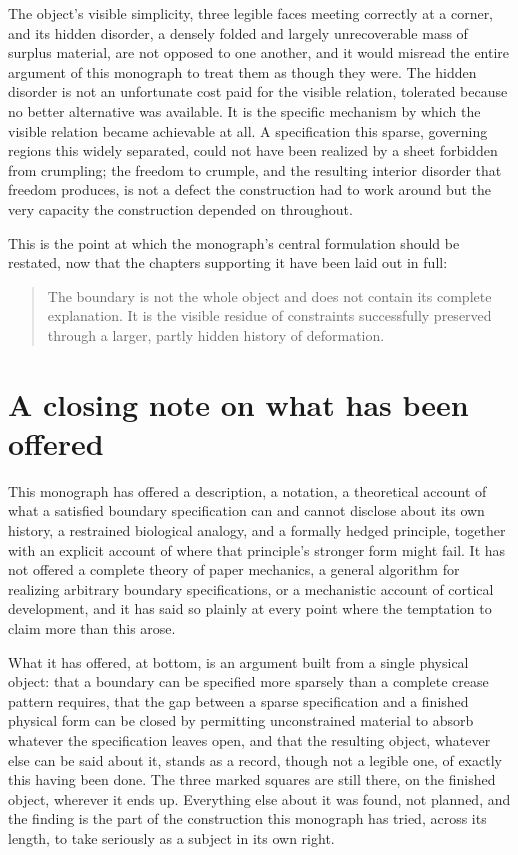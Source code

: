 \documentclass[11pt,oneside]{book}
\begin{document}
The object's visible simplicity, three legible faces meeting correctly
at a corner, and its hidden disorder, a densely folded and largely
unrecoverable mass of surplus material, are not opposed to one another,
and it would misread the entire argument of this monograph to treat them
as though they were. The hidden disorder is not an unfortunate cost paid
for the visible relation, tolerated because no better alternative was
available. It is the specific mechanism by which the visible relation
became achievable at all. A specification this sparse, governing regions
this widely separated, could not have been realized by a sheet forbidden
from crumpling; the freedom to crumple, and the resulting interior
disorder that freedom produces, is not a defect the construction had to
work around but the very capacity the construction depended on
throughout.

This is the point at which the monograph's central formulation should be
restated, now that the chapters supporting it have been laid out in
full:

\begin{quote}
The boundary is not the whole object and does not contain its complete
explanation. It is the visible residue of constraints successfully
preserved through a larger, partly hidden history of deformation.
\end{quote}

\hypertarget{a-closing-note-on-what-has-been-offered}{%
\section{A closing note on what has been
offered}\label{a-closing-note-on-what-has-been-offered}}

This monograph has offered a description, a notation, a theoretical
account of what a satisfied boundary specification can and cannot
disclose about its own history, a restrained biological analogy, and a
formally hedged principle, together with an explicit account of where
that principle's stronger form might fail. It has not offered a complete
theory of paper mechanics, a general algorithm for realizing arbitrary
boundary specifications, or a mechanistic account of cortical
development, and it has said so plainly at every point where the
temptation to claim more than this arose.

What it has offered, at bottom, is an argument built from a single
physical object: that a boundary can be specified more sparsely than a
complete crease pattern requires, that the gap between a sparse
specification and a finished physical form can be closed by permitting
unconstrained material to absorb whatever the specification leaves open,
and that the resulting object, whatever else can be said about it,
stands as a record, though not a legible one, of exactly this having
been done. The three marked squares are still there, on the finished
object, wherever it ends up. Everything else about it was found, not
planned, and the finding is the part of the construction this monograph
has tried, across its length, to take seriously as a subject in its own
right.
\end{document}

